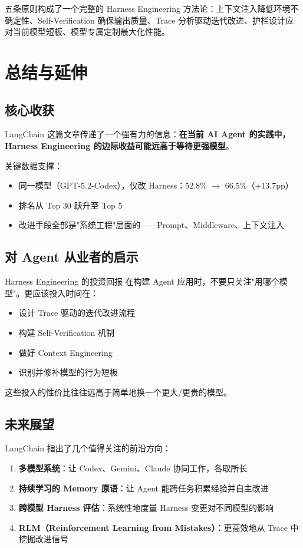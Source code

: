 \documentclass[a4paper]{article}
\begin{document}
五条原则构成了一个完整的 Harness Engineering 方法论：上下文注入降低环境不确定性、Self-Verification 确保输出质量、Trace 分析驱动迭代改进、护栏设计应对当前模型短板、模型专属定制最大化性能。


\section{总结与延伸}

\subsection{核心收获}

LangChain 这篇文章传递了一个强有力的信息：\textbf{在当前 AI Agent 的实践中，Harness Engineering 的边际收益可能远高于等待更强模型}。

关键数据支撑：
\begin{itemize}[leftmargin=1.5em]
    \item 同一模型（GPT-5.2-Codex），仅改 Harness：52.8\% $\rightarrow$ 66.5\%（+13.7pp）
    \item 排名从 Top 30 跃升至 Top 5
    \item 改进手段全部是"系统工程"层面的——Prompt、Middleware、上下文注入
\end{itemize}

\subsection{对 Agent 从业者的启示}

\begin{importantbox}{Harness Engineering 的投资回报}
在构建 Agent 应用时，不要只关注"用哪个模型"。更应该投入时间在：
\begin{itemize}[leftmargin=1.5em]
    \item 设计 Trace 驱动的迭代改进流程
    \item 构建 Self-Verification 机制
    \item 做好 Context Engineering
    \item 识别并修补模型的行为短板
\end{itemize}
这些投入的性价比往往远高于简单地换一个更大/更贵的模型。
\end{importantbox}

\subsection{未来展望}

LangChain 指出了几个值得关注的前沿方向：
\begin{enumerate}[leftmargin=2em]
    \item \textbf{多模型系统}：让 Codex、Gemini、Claude 协同工作，各取所长
    \item \textbf{持续学习的 Memory 原语}：让 Agent 能跨任务积累经验并自主改进
    \item \textbf{跨模型 Harness 评估}：系统性地度量 Harness 变更对不同模型的影响
    \item \textbf{RLM（Reinforcement Learning from Mistakes）}：更高效地从 Trace 中挖掘改进信号
\end{enumerate}
\end{document}
